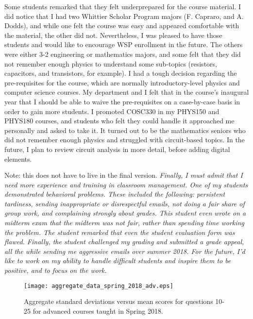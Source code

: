 \documentclass[../../main.tex]{subfiles}
\begin{document}
Some students remarked that they felt underprepared for the course material.  I did notice that I had two Whittier Scholar Program majors (F. Capraro, and A. Dodds), and while one felt the course was easy and appeared comfortable with the material, the other did not.  Nevertheless, I was pleased to have those students and would like to encourage WSP enrollment in the future.  The others were either 3-2 engineering or mathematics majors, and some felt that they did not remember enough physics to understand some sub-topics (resistors, capacitors, and transistors, for example).  I had a tough decision regarding the pre-requisites for the course, which are normally introductory-level physics and computer science courses.  My department and I felt that in the course's inaugural year that I should be able to waive the pre-requisites on a case-by-case basis in order to gain more students.  I promoted COSC330 in my PHYS150 and PHYS180 courses, and students who felt they could handle it approached me personally and asked to take it. It turned out to be the mathematics seniors who did not remember enough physics and struggled with circuit-based topics.  In the future, I plan to review circuit analysis in more detail, before adding digital elements. \\ \hspace{0.1cm}

Note: this does not have to live in the final version. \textit{Finally, I must admit that I need more experience and training in classroom management.  One of my students demonstrated behavioral problems.  These included the following: persistent tardiness, sending inappropriate or disrespectful emails, not doing a fair share of group work, and complaining strongly about grades.  This student even wrote \textit{on a midterm exam} that the midterm was not fair, rather than spending time working the problem.  The student remarked that even the student evaluation form was flawed.  Finally, the student challenged my grading and submitted a grade appeal, all the while sending me aggressive emails over summer 2018.  For the future, I'd like to work on my ability to handle difficult students and inspire them to be positive, and to focus on the work.}

\begin{figure}
\centering
\texttt{[image: aggregate\_data\_spring\_2018\_adv.eps]}
\caption{\label{fig:ag_data2} Aggregate standard deviations versus mean scores for questions 10-25 for advanced courses taught in Spring 2018.}
\end{figure}
\end{document}
